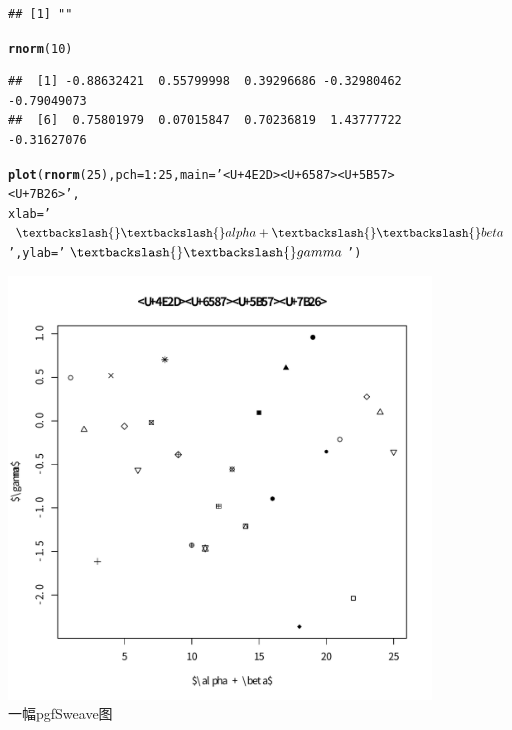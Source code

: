 \documentclass[twoside,UTF8]{ctexart}\usepackage[]{graphicx}\usepackage[]{color}
\makeatletter
\def\maxwidth{ %
  \ifdim\Gin@nat@width>\linewidth
    \linewidth
  \else
    \Gin@nat@width
  \fi
}
\newcommand{\hlnum}[1]{\textcolor[rgb]{0.686,0.059,0.569}{#1}}%
\newcommand{\hlstr}[1]{\textcolor[rgb]{0.192,0.494,0.8}{#1}}%
\newcommand{\hlopt}[1]{\textcolor[rgb]{0,0,0}{#1}}%
\newcommand{\hlstd}[1]{\textcolor[rgb]{0.345,0.345,0.345}{#1}}%
\newcommand{\hlkwc}[1]{\textcolor[rgb]{0.333,0.667,0.333}{#1}}%
\newcommand{\hlkwd}[1]{\textcolor[rgb]{0.737,0.353,0.396}{\textbf{#1}}}%
\newenvironment{kframe}{%
 \def\at@end@of@kframe{}%
 \ifinner\ifhmode%
  \def\at@end@of@kframe{\end{minipage}}%
  \begin{minipage}{\columnwidth}%
 \fi\fi%
 \def\FrameCommand##1{\hskip\@totalleftmargin \hskip-\fboxsep
 \colorbox{shadecolor}{##1}\hskip-\fboxsep
     \hskip-\linewidth \hskip-\@totalleftmargin \hskip\columnwidth}%
 \MakeFramed {\advance\hsize-\width
   \@totalleftmargin\z@ \linewidth\hsize
   \@setminipage}}%
 {\par\unskip\endMakeFramed%
 \at@end@of@kframe}
\newenvironment{knitrout}{}{} %
\makeatother
\begin{document}
\begin{CJK}{UTF8}{}
\begin{figure}
\begin{center}
\begin{knitrout}
\begin{kframe}
{\ttfamily\noindent{}}\begin{verbatim}
## [1] ""
\end{verbatim}
\begin{alltt}
\hlkwd{rnorm}\hlstd{(}\hlnum{10}\hlstd{)}
\end{alltt}
\begin{verbatim}
##  [1] -0.88632421  0.55799998  0.39296686 -0.32980462 -0.79049073
##  [6]  0.75801979  0.07015847  0.70236819  1.43777722 -0.31627076
\end{verbatim}
\begin{alltt}
\hlkwd{plot}\hlstd{(}\hlkwd{rnorm}\hlstd{(}\hlnum{25}\hlstd{),} \hlkwc{pch}\hlstd{=}\hlnum{1}\hlopt{:}\hlnum{25}\hlstd{,} \hlkwc{main}\hlstd{=}\hlstr{'<U+4E2D><U+6587><U+5B57><U+7B26>'}\hlstd{,}
     \hlkwc{xlab}\hlstd{=}\hlstr{'$\textbackslash{}\textbackslash{}alpha + \textbackslash{}\textbackslash{}beta$'}\hlstd{,} \hlkwc{ylab}\hlstd{=}\hlstr{'$\textbackslash{}\textbackslash{}gamma$'}\hlstd{)}
\end{alltt}
\end{kframe}
\includegraphics[width=\maxwidth]{figure/rnorm-1} 

\end{knitrout}
\end{center}
\caption{一幅pgfSweave图}
\end{figure}
\end{CJK}
\end{document}
